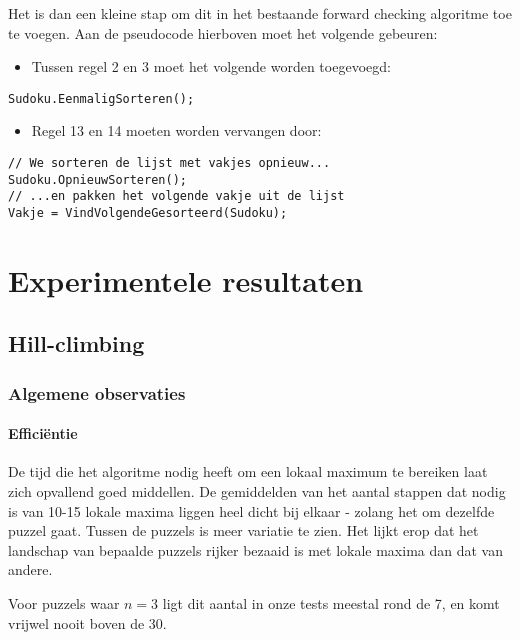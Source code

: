 \documentclass[]{report}
\begin{document}
Het is dan een kleine stap om dit in het bestaande forward checking algoritme toe te voegen. Aan de pseudocode hierboven moet het volgende gebeuren:
\begin{itemize}
\item Tussen regel 2 en 3 moet het volgende worden toegevoegd:
\end{itemize}
\begin{minipage}{\textwidth}
\begin{lstlisting}
Sudoku.EenmaligSorteren();
\end{lstlisting}
\end{minipage}
\begin{itemize}
\item Regel 13 en 14 moeten worden vervangen door:
\end{itemize}
\begin{minipage}{\textwidth}
\begin{lstlisting}
// We sorteren de lijst met vakjes opnieuw...
Sudoku.OpnieuwSorteren();
// ...en pakken het volgende vakje uit de lijst
Vakje = VindVolgendeGesorteerd(Sudoku);
\end{lstlisting}
\end{minipage}

\chapter{Experimentele resultaten}
\section{Hill-climbing}
\subsection{Algemene observaties}
\subsubsection{Effici\"{e}ntie}
De tijd die het algoritme nodig heeft om een lokaal maximum te bereiken laat zich opvallend goed middellen. De gemiddelden van het aantal stappen dat nodig is van 10-15 lokale maxima liggen heel dicht bij elkaar - zolang het om dezelfde puzzel gaat. Tussen de puzzels is meer variatie te zien. Het lijkt erop dat het landschap van bepaalde puzzels rijker bezaaid is met lokale maxima dan dat van andere.

Voor puzzels waar $n=3$ ligt dit aantal in onze tests meestal rond de 7, en komt vrijwel nooit boven de 30. 
\end{document}
